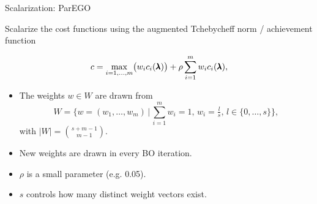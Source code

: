 \documentclass[11pt,compress,t,notes=noshow,xcolor=table]{beamer}
\begin{document}
\begin{vbframe}{Scalarization: ParEGO~}

Scalarize the cost functions using the augmented Tchebycheff norm / achievement function

\[
c = \max_{i=1,\dots,m}\bigl(w_i c_i(\pmb{\lambda})\bigr) 
    + \rho \sum_{i=1}^m w_i c_i(\pmb{\lambda}),
\]

\begin{itemize}
  \item The weights $w \in W$ are drawn from
    \[
      W = 
        \bigl\{ w = (w_1, \dots, w_m) \,\big|\,
                \sum_{i=1}^m w_i = 1,\, w_i = \tfrac{l}{s},\, l \in \{0,\dots,s\}
        \bigr\},
    \]
    with $\lvert W \rvert = \binom{s+m-1}{m-1}$.
  \item New weights are drawn in every BO iteration.
  \item $\rho$ is a small parameter (e.g. 0.05).
  \item $s$ controls how many distinct weight vectors exist.
\end{itemize}

\end{vbframe}
\end{document}
